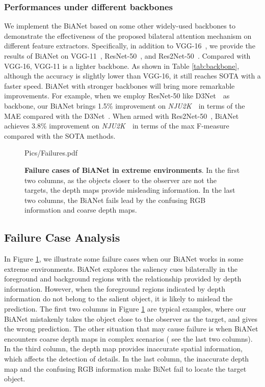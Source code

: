 \documentclass[journal]{IEEEtran}
\newcommand{\tabref}[1]{Table \ref{#1}}
\newcommand{\figref}[1]{Figure \ref{#1}}
\newcommand{\DTNet}{D3Net~\cite{fan2019D3Net}}
\newcommand{\NJU}{\textit{NJU2K}~\cite{ju2014depth}}
\begin{document}
\subsubsection{Performances under different backbones}
\label{sec:abl_combination}
We implement the BiANet based on some other widely-used backbones 
to demonstrate the effectiveness of the proposed bilateral attention mechanism on different feature extractors.
Specifically,
in addition to VGG-16~\cite{simonyan2015vgg}, 
we provide the results of BiANet on VGG-11~\cite{simonyan2015vgg}, ResNet-50~\cite{he2016deep}, and Res2Net-50~\cite{gao2019res2net}.
Compared with VGG-16, VGG-11 is a lighter backbone.
As shown in \tabref{tab:backbone}, 
although the accuracy is slightly lower than VGG-16, 
it still reaches SOTA with a faster speed.
BiANet with stronger backbones will bring more remarkable improvements. 
For example, 
when we employ ResNet-50 like \DTNet\ as backbone, 
our BiANet brings 1.5\% improvement on \NJU\ in terms of the MAE compared with the \DTNet.
When armed with Res2Net-50~\cite{gao2019res2net}, 
BiANet achieves 3.8\% improvement on \NJU\ in terms of the max F-measure compared with the SOTA methods.


\begin{figure}[t]
	\centering
	\begin{overpic}[width=.95\columnwidth]{Pics/Failures.pdf} 
	\end{overpic}
\caption{
		\textbf{Failure cases of BiANet in extreme environments}. 
		In the first two columns, as the objects closer to the observer are not the targets, the depth maps provide misleading information.
		In the last two columns, the BiANet fails lead by the confusing RGB information and coarse depth maps.
	}
\label{fig:Failures}
\end{figure}

\subsection{Failure Case Analysis}
In \figref{fig:Failures}, we illustrate some failure cases when our BiANet works in some extreme environments.
BiANet explores the saliency cues bilaterally in the foreground and background regions with the relationship provided by depth information.
However, when the foreground regions indicated by depth information do not belong to the salient object, 
it is likely to mislead the prediction.
The first two columns in \figref{fig:Failures} are typical examples,
where our BiANet mistakenly takes the object close to the observer as the target, and gives the wrong prediction.
The other situation that may cause failure is when BiANet encounters coarse depth maps in complex scenarios ( see the last two columns).
In the third column, the depth map provides inaccurate spatial information, which affects the detection of details.
In the last column, the inaccurate depth map and the confusing RGB information make BiNet fail to locate the target object.
\end{document}
